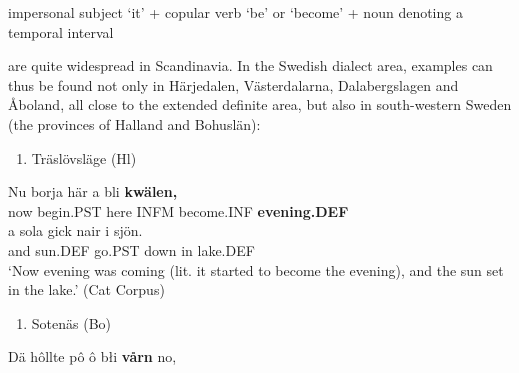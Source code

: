impersonal subject ‘it’ + copular verb ‘be’ or ‘become’ + noun denoting a temporal interval


are quite widespread in Scandinavia. In the Swedish dialect area, examples can thus be found not only in Härjedalen, Västerdalarna, Dalabergslagen and Åboland, all close to the extended definite area, but also in south-western Sweden (the provinces of Halland and Bohuslän): 

\begin{enumerate} %
\item 
Träslövsläge (Hl)

\end{enumerate} %
\ea\label{}
\gll Nu  borja  här  a  bli  \textbf{kwälen,} \\


now  begin.PST  here  INFM  become.INF  \textbf{evening.DEF} \\ %


\ea\label{}
\gll a  sola  gick  nair  i  sjön.\\


and  sun.DEF  go.PST  down  in  lake.DEF\\ %


‘Now evening was coming (lit. it started to become the evening), and the sun set in the lake.’ (Cat Corpus)
\z


\begin{enumerate} %
\item 
Sotenäs (Bo)

\end{enumerate} %
\ea\label{}
\gll Dä  hôllte  pô  ô  błi  \textbf{vårn} no,\\


